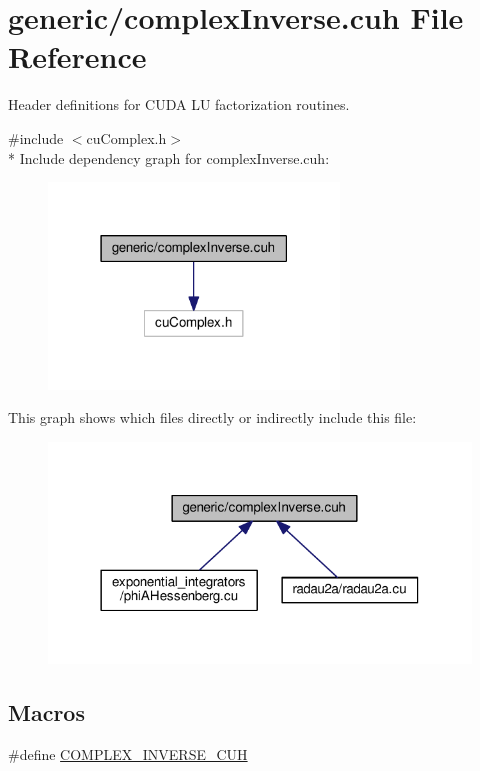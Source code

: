\hypertarget{complexInverse_8cuh}{}\section{generic/complex\+Inverse.cuh File Reference}
\label{complexInverse_8cuh}


Header definitions for C\+U\+DA LU factorization routines.  


{\ttfamily \#include $<$cu\+Complex.\+h$>$}\\*
Include dependency graph for complex\+Inverse.\+cuh\+:\nopagebreak
\begin{figure}[H]
\begin{center}
\leavevmode
\includegraphics[width=219pt]{complexInverse_8cuh__incl}
\end{center}
\end{figure}
This graph shows which files directly or indirectly include this file\+:\nopagebreak
\begin{figure}[H]
\begin{center}
\leavevmode
\includegraphics[width=318pt]{complexInverse_8cuh__dep__incl}
\end{center}
\end{figure}
\subsection*{Macros}
\begin{DoxyCompactItemize}
\item 
\#define \hyperlink{complexInverse_8cuh_a31ab82ad484c489345092056a631004d}{C\+O\+M\+P\+L\+E\+X\+\_\+\+I\+N\+V\+E\+R\+S\+E\+\_\+\+C\+UH}
\end{DoxyCompactItemize}
